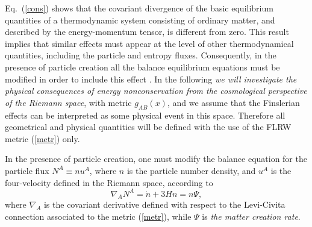 \documentclass[aps,superscriptaddress, showpacs,preprintnumbers, superscriptaddress, nofootinbibt,twocolumn]{revtex4-2}
\begin{document}
Eq.~(\ref{cons}) shows that the covariant divergence of
the basic equilibrium quantities of a thermodynamic system consisting of ordinary matter, and described by the energy-momentum tensor,  is different from zero. This result implies that similar effects must appear at the level of other thermodynamical quantities, including the particle and entropy fluxes. Consequently, in the presence of particle creation all the balance equilibrium equations must be modified in order to include this effect
 \cite{P-M,Lima,Su}. In the following {\it we will investigate the physical consequences of energy nonconservation from the cosmological perspective of the Riemann space}, with metric $g_{AB}(x)$, and we assume that the Finslerian effects can be interpreted as some physical event in this space. Therefore all geometrical and physical quantities will be defined with the use of the FLRW metric (\ref{metr}) only.

 In the presence of particle creation, one must modify the balance equation for the particle flux
$N^{A} \equiv nu^A$, where $n$ is the particle number density, and $u^{A}$ is the four-velocity defined in the Riemann space, according to
\begin{equation}
\nabla _{A}N^{A}=\dot{n}+3Hn=n\Psi,
\end{equation}
where $\nabla _A$ is the covariant derivative defined with respect to the Levi-Civita connection associated to the metric (\ref{metr}), while $\Psi $ is {\it the matter creation rate}.
\end{document}
